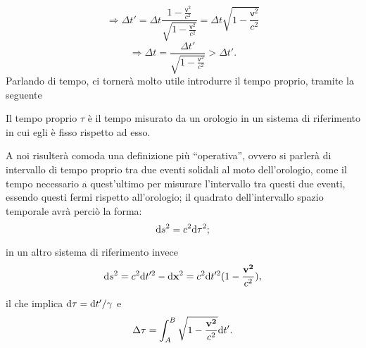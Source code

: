 \begin{displaymath}
\Longrightarrow \Delta t'=\Delta t
\frac{1-\frac{\mathsf{v}^2}{c^2}}{\sqrt{1-\frac{\mathsf{v}^2}{c^2}}}=\Delta
t \sqrt{1-\frac{\mathsf{v}^2}{c^2}}
\end{displaymath}
\begin{displaymath}
\Longrightarrow\Delta t=\frac{\Delta
  t'}{\sqrt{1-\frac{\mathsf{v}^2}{c^2}}}>\Delta t'.
\end{displaymath}
Parlando di tempo, ci torner\`a molto utile introdurre il tempo
proprio, tramite la seguente
\begin{definizione}
  Il tempo proprio $\tau$ \`e il tempo misurato
  da un orologio in un sistema di riferimento in cui egli \`e fisso
  rispetto ad esso.
\end{definizione}

A noi risulter\`a comoda una definizione pi\`u ``operativa'', ovvero
si parler\`a di intervallo di tempo
proprio tra due eventi solidali al moto dell'orologio, come il tempo
necessario a quest'ultimo per misurare l'intervallo tra questi due
eventi, essendo questi fermi rispetto all'orologio; il quadrato
dell'intervallo spazio temporale avr\`a perci\`o la forma:
\begin{displaymath}
\mathrm{d} s^2 = c^2 \mathrm{d} \tau^2;
\end{displaymath}

in un altro sistema di riferimento invece
\begin{displaymath}
\mathrm{d} s^2 = c^2 \mathrm{d} t'^2 - \mathrm{d} \mathbf{x}^2=c^2 \mathrm{d} t'^2
(1-\frac{\mathbf{v^2}}{c^2}),
\end{displaymath}

il che implica $\mathrm{d} \tau = \mathrm{d} t' / \gamma$ e
\begin{displaymath}
\Delta \tau = \int_A^B \sqrt{1-\frac{\mathbf{v^2}}{c^2}} \mathrm{d} t'.
\end{displaymath}


